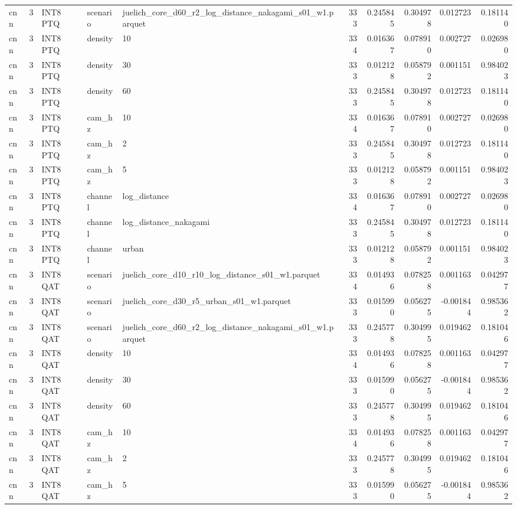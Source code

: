 \begin{tabular}{lrlllrrrrr}
cnn & 3 & INT8 PTQ & scenario & juelich\_core\_d60\_r2\_log\_distance\_nakagami\_s01\_w1.parquet & 333 & 0.245845 & 0.304978 & 0.012723 & 0.181140 \\
cnn & 3 & INT8 PTQ & density & 10 & 334 & 0.016367 & 0.078910 & 0.002727 & 0.026980 \\
cnn & 3 & INT8 PTQ & density & 30 & 333 & 0.012128 & 0.058792 & 0.001151 & 0.984023 \\
cnn & 3 & INT8 PTQ & density & 60 & 333 & 0.245845 & 0.304978 & 0.012723 & 0.181140 \\
cnn & 3 & INT8 PTQ & cam\_hz & 10 & 334 & 0.016367 & 0.078910 & 0.002727 & 0.026980 \\
cnn & 3 & INT8 PTQ & cam\_hz & 2 & 333 & 0.245845 & 0.304978 & 0.012723 & 0.181140 \\
cnn & 3 & INT8 PTQ & cam\_hz & 5 & 333 & 0.012128 & 0.058792 & 0.001151 & 0.984023 \\
cnn & 3 & INT8 PTQ & channel & log\_distance & 334 & 0.016367 & 0.078910 & 0.002727 & 0.026980 \\
cnn & 3 & INT8 PTQ & channel & log\_distance\_nakagami & 333 & 0.245845 & 0.304978 & 0.012723 & 0.181140 \\
cnn & 3 & INT8 PTQ & channel & urban & 333 & 0.012128 & 0.058792 & 0.001151 & 0.984023 \\
cnn & 3 & INT8 QAT & scenario & juelich\_core\_d10\_r10\_log\_distance\_s01\_w1.parquet & 334 & 0.014936 & 0.078258 & 0.001163 & 0.042977 \\
cnn & 3 & INT8 QAT & scenario & juelich\_core\_d30\_r5\_urban\_s01\_w1.parquet & 333 & 0.015990 & 0.056275 & -0.001844 & 0.985362 \\
cnn & 3 & INT8 QAT & scenario & juelich\_core\_d60\_r2\_log\_distance\_nakagami\_s01\_w1.parquet & 333 & 0.245778 & 0.304995 & 0.019462 & 0.181046 \\
cnn & 3 & INT8 QAT & density & 10 & 334 & 0.014936 & 0.078258 & 0.001163 & 0.042977 \\
cnn & 3 & INT8 QAT & density & 30 & 333 & 0.015990 & 0.056275 & -0.001844 & 0.985362 \\
cnn & 3 & INT8 QAT & density & 60 & 333 & 0.245778 & 0.304995 & 0.019462 & 0.181046 \\
cnn & 3 & INT8 QAT & cam\_hz & 10 & 334 & 0.014936 & 0.078258 & 0.001163 & 0.042977 \\
cnn & 3 & INT8 QAT & cam\_hz & 2 & 333 & 0.245778 & 0.304995 & 0.019462 & 0.181046 \\
cnn & 3 & INT8 QAT & cam\_hz & 5 & 333 & 0.015990 & 0.056275 & -0.001844 & 0.985362 \\

\end{tabular}
